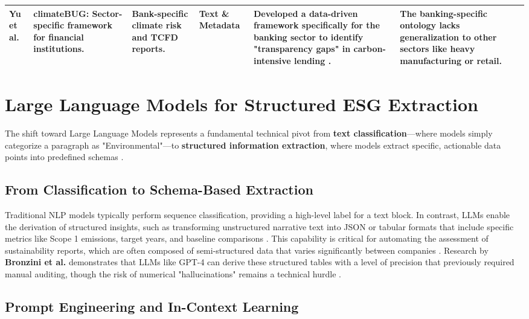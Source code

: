 \documentclass[english, online, cse, master]{dithesis}
\begin{document}
\begin{landscape}
\begin{table}[p]
\begin{tabularx}{\linewidth}{|p{1.8cm}|p{3.5cm}|p{3cm}|p{1.8cm}|X|X|}
\textbf{Yu et al.}  \parencite{yinan_yu_e282fd98} & \textbf{climateBUG}: Sector-specific framework for financial institutions. & Bank-specific climate risk and TCFD reports. & Text \& Metadata & Developed a data-driven framework specifically for the banking sector to identify "transparency gaps" in carbon-intensive lending  \parencite{yinan_yu_e282fd98}. & The banking-specific ontology lacks generalization to other sectors like heavy manufacturing or retail. \\ \hline
\end{tabularx}
\end{table}
\end{landscape}



\section{Large Language Models for Structured ESG Extraction}

The shift toward Large Language Models represents a fundamental technical pivot from \textbf{text classification}—where models simply categorize a paragraph as "Environmental"—to \textbf{structured information extraction}, where models extract specific, actionable data points into predefined schemas  \parencite[]{seyed_alireza_mousavian_anaraki_b56a1c0f, marco_bronzini_bf94d949}.
\subsection{From Classification to Schema-Based Extraction}

Traditional NLP models typically perform sequence classification, providing a high-level label for a text block. In contrast, LLMs enable the derivation of structured insights, such as transforming unstructured narrative text into JSON or tabular formats that include specific metrics like Scope 1 emissions, target years, and baseline comparisons  \parencite{marco_bronzini_bf94d949}. This capability is critical for automating the assessment of sustainability reports, which are often composed of semi-structured data that varies significantly between companies  \parencite[]{jacob_beck_9548a833, marco_bronzini_bf94d949}. Research by \textbf{Bronzini et al.} demonstrates that LLMs like GPT-4 can derive these structured tables with a level of precision that previously required manual auditing, though the risk of numerical "hallucinations" remains a technical hurdle  \parencite{marco_bronzini_bf94d949}.
\subsection{Prompt Engineering and In-Context Learning}
\end{document}
